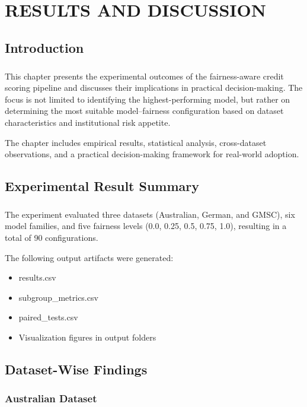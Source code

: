 \chapter{\MakeUppercase{Results and Discussion}}

\section{Introduction}
\paragraph{}
This chapter presents the experimental outcomes of the fairness-aware credit scoring pipeline and discusses their implications in practical decision-making. The focus is not limited to identifying the highest-performing model, but rather on determining the most suitable model–fairness configuration based on dataset characteristics and institutional risk appetite.

The chapter includes empirical results, statistical analysis, cross-dataset observations, and a practical decision-making framework for real-world adoption.

\section{Experimental Result Summary}
\paragraph{}
The experiment evaluated three datasets (Australian, German, and GMSC), six model families, and five fairness levels (0.0, 0.25, 0.5, 0.75, 1.0), resulting in a total of 90 configurations.

The following output artifacts were generated:
\begin{itemize}
    \item results.csv
    \item subgroup\_metrics.csv
    \item paired\_tests.csv
    \item Visualization figures in output folders
\end{itemize}

\section{Dataset-Wise Findings}

\subsection{Australian Dataset}
